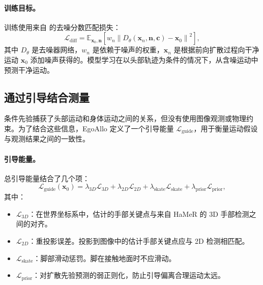 \documentclass[../../book-main_zh.tex]{subfiles}
\begin{document}
\paragraph{训练目标。}
训练使用来自  的去噪分数匹配损失：
\begin{equation}
    \mathcal{L}_{\text{diff}} = \mathbb{E}_{\boldsymbol{x}_0, \boldsymbol{n}} \left[ w_n
    \left\| D_\theta(\boldsymbol{x}_n, \boldsymbol{n}, \boldsymbol{c}) - \boldsymbol{x}_0 \right\|^2 \right],
\end{equation}
其中 $D_\theta$ 是去噪器网络，$w_n$ 是依赖于噪声的权重，$\boldsymbol{x}_n$ 是根据前向扩散过程向干净运动 $\boldsymbol{x}_0$ 添加噪声获得的。模型学习在以头部轨迹为条件的情况下，从含噪运动中预测干净运动。

\subsection{通过引导结合测量}
\label{sub:egoallo_guidance}

条件先验捕获了头部运动和身体运动之间的关系，但没有使用图像观测或物理约束。为了结合这些信息，EgoAllo 定义了一个引导能量 $\mathcal{L}_{\text{guide}}$，用于衡量运动假设与观测结果之间的一致性。

\paragraph{引导能量。}
总引导能量结合了几个项：
\begin{equation}
    \mathcal{L}_{\text{guide}}(\boldsymbol{x}_0) =
    \lambda_{3D}\mathcal{L}_{3D} + \lambda_{2D}\mathcal{L}_{2D} +
    \lambda_{\text{skate}}\mathcal{L}_{\text{skate}} +
    \lambda_{\text{prior}}\mathcal{L}_{\text{prior}},
\end{equation}
其中：
\begin{itemize}
    \item $\mathcal{L}_{3D}$：在世界坐标系中，估计的手部关键点与来自 HaMeR 的 3D 手部检测之间的对齐。
    \item $\mathcal{L}_{2D}$：重投影误差。投影到图像中的估计手部关键点应与 2D 检测相匹配。
    \item $\mathcal{L}_{\text{skate}}$：脚部滑动惩罚。脚在接触地面时不应滑动。
    \item $\mathcal{L}_{\text{prior}}$：对扩散先验预测的弱正则化，防止引导偏离合理运动太远。
\end{itemize}
\end{document}
